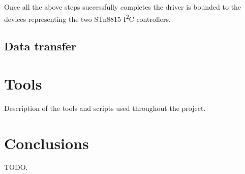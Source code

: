 \documentclass[a4paper,10pt]{article}
\newcommand{\icc}{I\textsuperscript{2}C }
\begin{document}
\begin{multicols}{2}
Once all the above steps successfully completes the driver is bounded to the
devices representing the two STn8815 \icc controllers.


\subsection{Data transfer}
\label{sec:adapter_data_transfer}





\section{Tools}
\label{sec:tools}

Description of the tools and scripts used throughout the project.



\section{Conclusions}

TODO.







\end{multicols}
\end{document}
